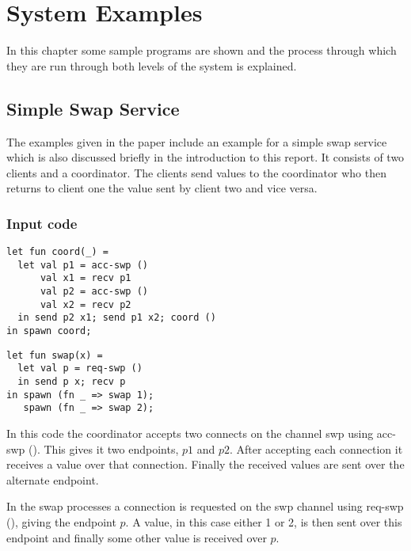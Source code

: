 \chapter{System Examples} \label{examplesChapt}

In this chapter some sample programs are shown and the process through which they are run through both levels of the system is explained. 

\section{Simple Swap Service}

The examples given in the paper \cite{paper1} include an example for a simple swap service which is also discussed briefly in the introduction to this report. It consists of two clients and a coordinator. The clients send values to the coordinator who then returns to client one the value sent by client two and vice versa.

\subsection{Input code}

\begin{minipage}{.45\textwidth}
\begin{lstlisting}[backgroundcolor=\color{white},numbers=none]
let fun coord(_) =
  let val p1 = acc-swp ()
      val x1 = recv p1
      val p2 = acc-swp ()
      val x2 = recv p2
  in send p2 x1; send p1 x2; coord ()
in spawn coord;
\end{lstlisting}
\end{minipage}
\hfill
\begin{minipage}{.45\textwidth}
\begin{lstlisting}[backgroundcolor=\color{white},numbers=none]
let fun swap(x) =
  let val p = req-swp ()
  in send p x; recv p
in spawn (fn _ => swap 1);
   spawn (fn _ => swap 2);
\end{lstlisting}
\vspace{2em}
\end{minipage} 

In this code the coordinator accepts two connects on the channel swp using acc-swp (). This gives it two endpoints, $p1$ and $p2$. After accepting each connection it receives a value over that connection. Finally the received values are sent over the alternate endpoint. 

In the swap processes a connection is requested on the swp channel using req-swp (), giving the endpoint $p$. A value, in this case either 1 or 2, is then sent over this endpoint and finally some other value is received over $p$. 

